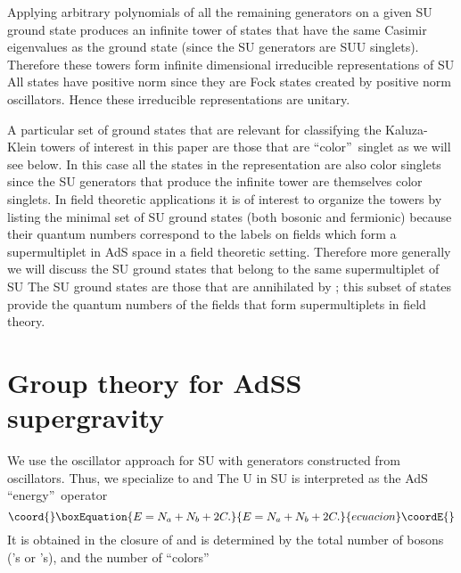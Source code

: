 \documentclass[a4paper,aps,preprint,nofootinbib]{revtex4}
\begin{document}
Applying arbitrary polynomials of all the remaining generators on a given SU\coordHE{} ground state produces an infinite tower of states that
have the same Casimir eigenvalues as the ground state (since the SU\coordHE{} generators are SU\coordHE{}U\myHighlight{$\left(
1\right)$}\coordHE{} singlets). Therefore these towers form infinite dimensional
irreducible representations of SU\coordHE{} All states have
positive norm since they are Fock states created by positive norm
oscillators. Hence these irreducible representations are unitary.

A particular set of ground states that are relevant for classifying the
Kaluza-Klein towers of interest in this paper are those that are
\textquotedblleft color\textquotedblright\ singlet as we will see below. In
this case all the states in the representation are also color singlets since
the SU\coordHE{} generators that produce the infinite tower
are themselves color singlets. In field theoretic applications it is of
interest to organize the towers by listing the minimal set of SU\coordHE{} ground states (both bosonic and fermionic) because their
quantum numbers correspond to the labels on fields which form a
supermultiplet in AdS\coordHE{} space in a field theoretic setting. Therefore
more generally we will discuss the SU\coordHE{} ground states that
belong to the same supermultiplet of SU\coordHE{} The SU\coordHE{} ground states are those that are annihilated by \coordHE{}; this subset of states provide the quantum numbers of the
fields that form supermultiplets in field theory.

\section{Group theory for AdS\coordHE{}S\coordHE{} supergravity}

We use the oscillator approach for SU\coordHE{} with generators
constructed from oscillators. Thus, we specialize to \coordHE{} and \coordHE{} The U\myHighlight{$%
\left( 1\right) $}\coordHE{} in SU\coordHE{} is interpreted as the AdS
\textquotedblleft energy\textquotedblright\ operator
\begin{equation}\coord{}\boxEquation{
E=N_{a}+N_{b}+2C.  \label{E}
}{
E=N_{a}+N_{b}+2C.  }{ecuacion}\coordE{}\end{equation}
It is obtained in the closure of \coordHE{} and is determined by the total number of bosons (\coordHE{}'s or \coordHE{}'s), and the
number of \textquotedblleft colors\textquotedblright\ \coordHE{}
\end{document}
